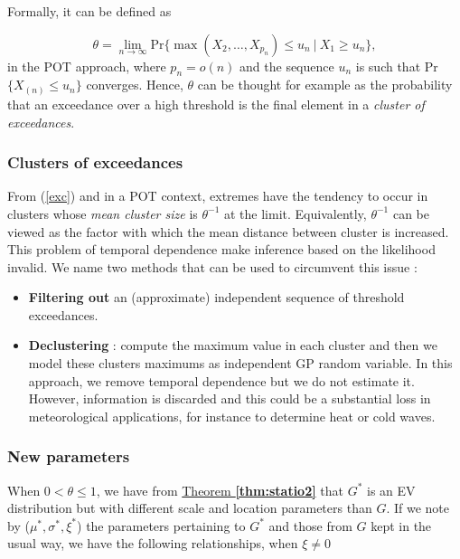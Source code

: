 Formally, it can be defined as

\begin{equation}\label{exc}
\theta=\displaystyle{\lim_{n \to \infty}}\text{Pr}\Big\{\max(X_2,\dots,X_{p_n})\leq u_n\ | \ X_1\geq u_n\Big\},
\end{equation}
in the POT approach, where $p_n=o(n)$ and the sequence $u_n$ is such that Pr$\big\{X_{(n)} \leq u_n\big\}$ converges.
Hence, $\theta$ can be thought for example as the probability that an exceedance over a high threshold is the final element in a \textit{cluster of exceedances}.%


\subsubsection*{Clusters of exceedances}

From (\ref{exc}) and in a POT context, extremes have the tendency to occur in clusters whose \emph{mean cluster size} is $\theta^{-1}$ at the limit. Equivalently, $\theta^{-1}$ can be viewed as the factor with which the mean distance between cluster is increased.
This problem of temporal dependence make inference based on the likelihood invalid.
We name two methods that can be used to circumvent this issue : 

\begin{itemize}
	\item \textbf{Filtering out} an (approximate) independent sequence of threshold exceedances.
	\item \textbf{Declustering} : compute the maximum value in each cluster and then we model these clusters maximums as independent GP random variable. In this approach, we remove temporal dependence but we do not estimate it.
	However, information is discarded and this could be a substantial loss in meteorological applications, for instance to determine heat or cold waves.
\end{itemize}


\subsubsection*{New parameters}
 When $0<\theta\leq 1$, we have from \hyperref[thm:statio2]{Theorem \textbf{\ref{thm:statio2}}} that $G^*$ is an EV distribution but with different scale and location parameters than $G$. If we note by ($\mu^*,\sigma^*,\xi^*$) the parameters pertaining to $G^*$ and those from $G$ kept in the usual way, we have the following relationships, when $\xi\neq 0$

